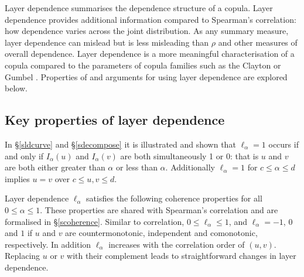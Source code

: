\documentclass[authoryear]{elsarticle}
\newcommand{\sref}[1]{\S\ref{#1}}
\begin{document}
Layer dependence summarises the dependence structure of a copula. Layer dependence provides additional information compared to Spearman's correlation: how dependence varies across the joint distribution. As  any summary measure, layer dependence can mislead but is less misleading than $\rho$ and other measures of overall dependence. Layer dependence is  a more meaningful characterisation of a copula compared to the parameters of copula families such as the Clayton or Gumbel \citep{mcneil2005qrm}. Properties of and arguments for using layer dependence are explored below.

\subsection{Key properties of layer dependence}

In \sref{sldcurve} and \sref{sdecompose} it is illustrated and shown  that  $\ell_\alpha=1$  occurs if and only if $I_\alpha(u)$ and $I_\alpha(v)$ are both simultaneously 1 or 0: that is $u$ and $v$ are both  either greater than $\alpha$ or less than $\alpha$.  Additionally $\ell_\alpha=1$ for $c\le\alpha\le d$ implies $u=v$ over $c\le u,v\le d$.


Layer dependence $\ell_\alpha$ satisfies the following coherence properties for all $0\le\alpha\le 1$. These properties are shared with Spearman's correlation and are formalised in \sref{scoherence}. Similar to correlation, $0\le\ell_\alpha\le 1$, and $\ell_\alpha=-1$, $0$ and $1$ if $u$ and $v$ are countermonotonic, independent and comonotonic, respectively. In addition $\ell_\alpha$ increases with the correlation order of $(u,v)$. Replacing $u$ or $v$ with their complement leads to straightforward changes in layer dependence.
\end{document}

